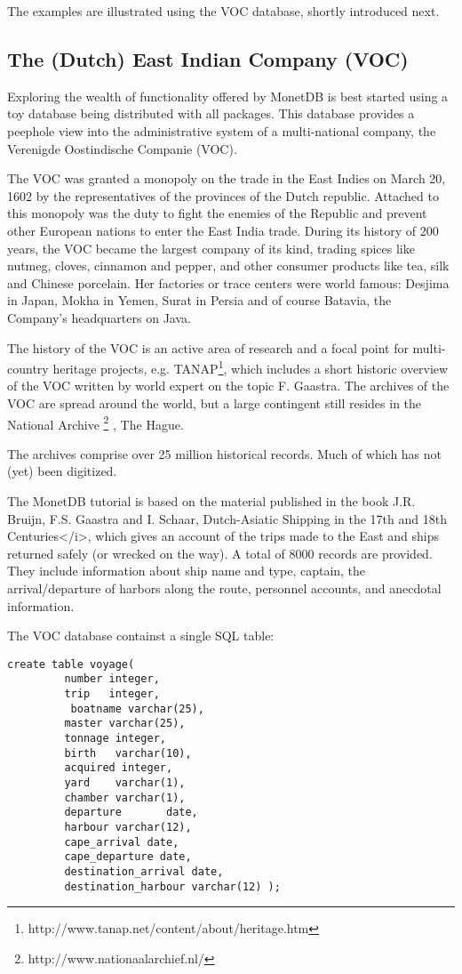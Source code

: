 \documentclass[10pt,twocolumn,fleqn]{article}
\begin{document}
The examples are illustrated using the VOC database, shortly introduced
next.
\subsection{The (Dutch) East Indian Company (VOC)}
Exploring the wealth of functionality offered by MonetDB is best
started using a toy database being distributed with all packages.
This database provides a peephole view into the administrative
system of a multi-national company, the Verenigde Oostindische Companie (VOC).

The VOC was granted a monopoly on the trade in the East Indies on March 20, 1602
by the representatives of the provinces of the Dutch republic.
Attached to this monopoly was the duty to fight the enemies of the Republic and 
prevent other European nations to enter the East India trade.
During its history of 200 years, the VOC became the largest company of its kind, 
trading spices like nutmeg, cloves, cinnamon and pepper, and other consumer 
products like tea, silk and Chinese porcelain.
Her factories or trace centers were world famous: Desjima in Japan, 
Mokha in Yemen, Surat in Persia and of course Batavia, 
the Company's headquarters on Java.

The history of the VOC is an active area of research and
a focal point for multi-country heritage projects, e.g. 
TANAP\footnote{http://www.tanap.net/content/about/heritage.htm},
which includes a short historic overview of the VOC written by
world expert on the topic F. Gaastra.
The archives of the VOC are spread around the world, but a large
contingent still resides in the 
National Archive
\footnote{ http://www.nationaalarchief.nl/ }
, The Hague.

The archives comprise over 25 million historical records.
Much of which has not (yet) been digitized.

The MonetDB tutorial is based on the material published in the book 
J.R. Bruijn, F.S. Gaastra and I. Schaar, Dutch-Asiatic Shipping in the 17th and 18th Centuries</i>, which
gives an account of the trips made to the East and ships returned safely
(or wrecked on the way). A total of 8000 records are provided. 
They include information about ship name and type, captain,
the arrival/departure of harbors along the route, personnel accounts, 
and anecdotal information.

The VOC database containst a single SQL table:
{\footnotesize
\begin{verbatim}
create table voyage(
         number integer,
         trip   integer,
          boatname varchar(25),
         master varchar(25),
         tonnage integer,
         birth   varchar(10),
         acquired integer,
         yard    varchar(1),
         chamber varchar(1),
         departure       date,
         harbour varchar(12),
         cape_arrival date,
         cape_departure date,
         destination_arrival date,
         destination_harbour varchar(12) );
\end{verbatim}
}
\end{document}
